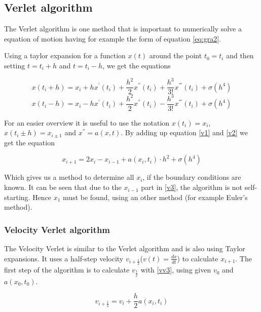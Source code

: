 \documentclass[10pt,a4paper]{article}
\begin{document}
\subsection{Verlet algorithm}

The Verlet algorithm is one method that is important to numerically solve a equation of motion having for example the form of equation \eqref{eq:gra2}. 

Using a taylor expansion for a function $x(t)$ around the point $t_0 = t_i$ and then setting $t = t_i + h$ and $t = t_i - h$, we get the equations

\begin{equation}
\label{v1}
x(t_i + h) = x_i + h  x^{'}(t_i) + \frac{h^2}{2}  x^{''}(t_i) + \frac{h^3}{3!}  x^{'''}(t_i) + \sigma (h^4)
\end{equation}
\begin{equation}
\label{v2}
x(t_i - h) = x_i - h  x^{'}(t_i) + \frac{h^2}{2}  x^{''}(t_i) - \frac{h^3}{3!}  x^{'''}(t_i) + \sigma (h^4)
\end{equation}

For an easier overview it is useful to use the notation $x(t_i) = x_i$, $x(t_i \pm h) = x_{i \pm 1}$ and $x^{''} = a(x, t)$. By adding up equation \eqref{v1} and \eqref{v2} we get the equation

\begin{equation}
\label{v3}
	x_{i+1} = 2 x_i - x_{i-1} + a(x_i, t_i) \cdot h^2 + \sigma(h^4)
\end{equation}

Which gives us a method to determine all $x_i$, if the boundary conditions are known. It can be seen that due to the $x_{i-1}$ part in \eqref{v3}, the algorithm is not self-starting. Hence $x_1$ must be found, using an other method (for example Euler's method).

\subsubsection{Velocity Verlet algorithm}

The Velocity Verlet is similar to the Verlet algorithm and is also using Taylor expansions. It uses a half-step velocity $v_{i+\frac{1}{2}}$($v(t) = \frac{dx}{dt}$) to calculate $x_{i+1}$. The first step of the algorithm is to calculate $v_{\frac{1}{2}}$ with \eqref{vv3}, using given $v_0$ and $a(x_0, t_0)$.

\begin{equation}
	\label{vv3}
	v_{i + \frac{1}{2}} = v_i + \frac{h}{2} a(x_i, t_i)
\end{equation}
\end{document}
